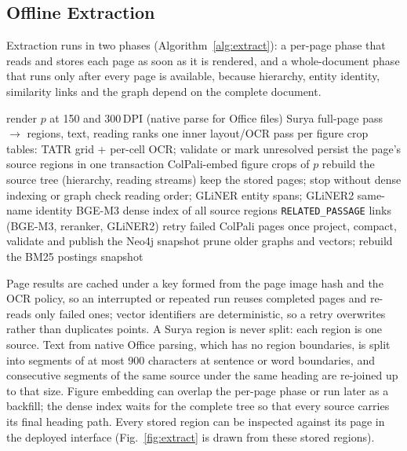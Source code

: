\documentclass[runningheads]{llncs}
\begin{document}
\subsection{Offline Extraction}
Extraction runs in two phases (Algorithm~\ref{alg:extract}): a per-page phase that reads and stores each page as soon as it is rendered, and a whole-document phase that runs only after every page is available, because hierarchy, entity identity, similarity links and the graph depend on the complete document.

\begin{algorithm}[t]
\caption{Offline extraction pipeline (one document version)}\label{alg:extract}
\begin{algorithmic}[1]
  \State render $p$ at 150 and 300\,DPI (native parse for Office files)
  \State Surya full-page pass $\rightarrow$ regions, text, reading ranks 
  \State one inner layout/OCR pass per figure crop
  \State tables: TATR grid + per-cell OCR; validate or mark unresolved 
  \State persist the page's source regions in one transaction
  \State ColPali-embed figure crops of $p$ 
  \State rebuild the source tree (hierarchy, reading streams)
\EndFor
{} \State keep the stored pages; stop without dense indexing or graph \EndIf
\State check reading order; GLiNER entity spans; GLiNER2 same-name identity
\State BGE-M3 dense index of all source regions
\State \texttt{RELATED\_PASSAGE} links (BGE-M3, reranker, GLiNER2)
\State retry failed ColPali pages once
\State project, compact, validate and publish the Neo4j snapshot
\State prune older graphs and vectors; rebuild the BM25 postings snapshot
\end{algorithmic}
\end{algorithm}

Page results are cached under a key formed from the page image hash and the OCR policy, so an interrupted or repeated run reuses completed pages and re-reads only failed ones; vector identifiers are deterministic, so a retry overwrites rather than duplicates points. A Surya region is never split: each region is one source. Text from native Office parsing, which has no region boundaries, is split into segments of at most 900 characters at sentence or word boundaries, and consecutive segments of the same source under the same heading are re-joined up to that size. Figure embedding can overlap the per-page phase or run later as a backfill; the dense index waits for the complete tree so that every source carries its final heading path. Every stored region can be inspected against its page in the deployed interface (Fig.~\ref{fig:extract} is drawn from these stored regions).
\end{document}

